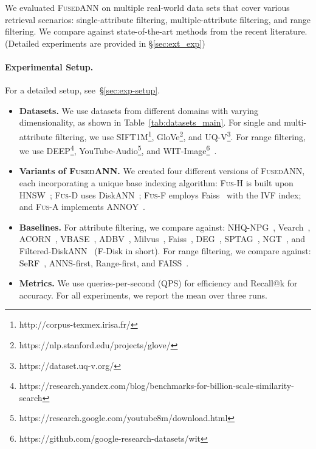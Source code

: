 \documentclass[numbers,sort]{article}
\begin{document}
We evaluated \textsc{FusedANN} on multiple real-world data sets that cover various retrieval scenarios: single-attribute filtering, multiple-attribute filtering, and range filtering. We compare against state-of-the-art methods from the recent literature. (Detailed experiments are provided in \S\ref{sec:ext_exp})

\paragraph{Experimental Setup.} For a detailed setup, see~\hyperref[sec:exp-setup]{\S\ref*{sec:exp-setup}}.
\begin{itemize}[leftmargin=*]
    \item \textbf{Datasets.} We use datasets from different domains with varying dimensionality, as shown in Table~\ref{tab:datasets_main}. For single and multi-attribute filtering, we use SIFT1M\footnote{http://corpus-texmex.irisa.fr/}, GloVe\footnote{https://nlp.stanford.edu/projects/glove/}, and UQ-V\footnote{https://dataset.uq-v.org/}. For range filtering, we use DEEP\footnote{https://research.yandex.com/blog/benchmarks-for-billion-scale-similarity-search}, YouTube-Audio\footnote{https://research.google.com/youtube8m/download.html}, and WIT-Image\footnote{https://github.com/google-research-datasets/wit}~\cite{zuo2024serf,xu2025iranggraph}.
    \item \textbf{Variants of \textsc{FusedANN}.} We created four different versions of \textsc{FusedANN}, each incorporating a unique base indexing algorithm: \textsc{Fus-H} is built upon HNSW~\cite{malkov2018efficient}; \textsc{Fus-D} uses DiskANN~\cite{subramanya2019diskann}; \textsc{Fus-F} employs Faiss~\cite{johnson2019billion} with the IVF index; and \textsc{Fus-A} implements ANNOY~\cite{annoy}.
    \item \textbf{Baselines.} For attribute filtering, we compare against: NHQ-NPG~\cite{wang2023efficient}, Vearch~\cite{vearch}, ACORN~\cite{patel2024acorn}, VBASE~\cite{vbase}, ADBV~\cite{zhu2020adbv}, Milvus~\cite{wang2021milvus}, Faiss~\cite{johnson2019billion}, DEG~\cite{deg}, SPTAG~\cite{MicrosoftSPTAG}, NGT~\cite{yahooNGT}, and Filtered-DiskANN~\cite{gollapudi2023filtered} (F-Disk in short). For range filtering, we compare against: SeRF~\cite{zuo2024serf}, ANNS-first, Range-first, and FAISS~\cite{johnson2019billion}. 
    \item \textbf{Metrics.} We use queries-per-second (QPS) for efficiency and Recall@k for accuracy. For all experiments, we report the mean over three runs.

\end{itemize}
\end{document}

